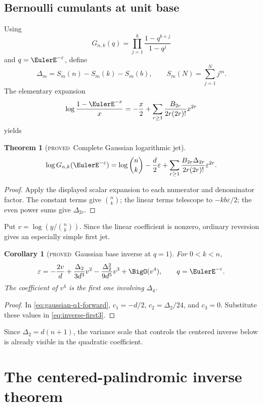 \documentclass[11pt,letterpaper,oneside,openany]{book}
\newtheorem{theorem}{Theorem}[chapter]
\newtheorem{corollary}{Corollary}[chapter]
\theoremstyle{definition}
\theoremstyle{remark}
\newcommand{\statusproved}{\textcolor{provedgreen}{\textsc{proved}}}
\begin{document}
\section{Bernoulli cumulants at unit base}
Using
\[
 G_{n,k}(q)=\prod_{j=1}^k\frac{1-q^{b+j}}{1-q^j}
\]
and \(q=\EulerE^{-\varepsilon}\), define
\[
 \Delta_m=S_m(n)-S_m(k)-S_m(b),
 \qquad S_m(N)=\sum_{j=1}^{N}j^m.
\]
The elementary expansion
\[
 \log\frac{1-\EulerE^{-x}}x
 =-\frac x2+\sum_{r\ge1}
 \frac{B_{2r}}{2r(2r)!}x^{2r}
\]
yields
\begin{theorem}[\statusproved\ Complete Gaussian logarithmic jet]
\begin{equation}
 \log G_{n,k}(\EulerE^{-\varepsilon})
 =\log\binom nk-\frac d2\varepsilon
 +\sum_{r\ge1}
 \frac{B_{2r}\Delta_{2r}}{2r(2r)!}\varepsilon^{2r}.
 \label{eq:gaussian-q1-forward}
\end{equation}
\end{theorem}
\begin{proof}
Apply the displayed scalar expansion to each numerator and denominator factor.
The constant terms give \(\binom nk\); the linear terms telescope to
\(-kb\varepsilon/2\); the even power sums give \(\Delta_{2r}\).
\end{proof}

Put \(v=\log(y/\binom nk)\).  Since the linear coefficient is nonzero,
ordinary reversion gives an especially simple first jet.

\begin{corollary}[\statusproved\ Gaussian base inverse at \(q=1\)]
For \(0<k<n\),
\begin{equation}
 \varepsilon=-\frac{2v}{d}
 +\frac{\Delta_2}{3d^3}v^2
 -\frac{\Delta_2^2}{9d^5}v^3
 +\BigO(v^4),
 \qquad q=\EulerE^{-\varepsilon}.
 \label{eq:gaussian-q1-inverse}
\end{equation}
The coefficient of \(v^4\) is the first one involving \(\Delta_4\).
\end{corollary}
\begin{proof}
In \cref{eq:gaussian-q1-forward},
\(c_1=-d/2\), \(c_2=\Delta_2/24\), and \(c_3=0\).  Substitute these values in
\cref{eq:inverse-first3}.
\end{proof}

Since \(\Delta_2=d(n+1)\), the variance scale that controls the centered inverse
below is already visible in the quadratic coefficient.

\chapter{The centered-palindromic inverse theorem}
\end{document}

